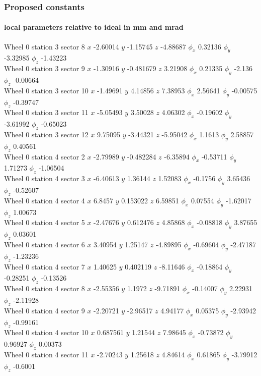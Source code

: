 \documentclass[compress]{beamer}
\begin{document}
\begin{frame}
\frametitle{Proposed constants}
\framesubtitle{local parameters relative to ideal in mm and mrad}

\tiny

Wheel 0 station 3 sector 8 $x$ -2.60014 $y$ -1.15745 $z$ -4.88687 $\phi_x$ 0.32136 $\phi_y$ -3.32985 $\phi_z$ -1.43223 \\
Wheel 0 station 3 sector 9 $x$ -1.30916 $y$ -0.481679 $z$ 3.21908 $\phi_x$ 0.21335 $\phi_y$ -2.136 $\phi_z$ -0.00664 \\
Wheel 0 station 3 sector 10 $x$ -1.49691 $y$ 4.14856 $z$ 7.38953 $\phi_x$ 2.56641 $\phi_y$ -0.00575 $\phi_z$ -0.39747 \\
Wheel 0 station 3 sector 11 $x$ -5.05493 $y$ 3.50028 $z$ 4.06302 $\phi_x$ -0.19602 $\phi_y$ -3.61992 $\phi_z$ -0.65023 \\
Wheel 0 station 3 sector 12 $x$ 9.75095 $y$ -3.44321 $z$ -5.95042 $\phi_x$ 1.1613 $\phi_y$ 2.58857 $\phi_z$ 0.40561 \\
Wheel 0 station 4 sector 2 $x$ -2.79989 $y$ -0.482284 $z$ -6.35894 $\phi_x$ -0.53711 $\phi_y$ 1.71273 $\phi_z$ -1.06504 \\
Wheel 0 station 4 sector 3 $x$ -6.40613 $y$ 1.36144 $z$ 1.52083 $\phi_x$ -0.1756 $\phi_y$ 3.65436 $\phi_z$ -0.52607 \\
Wheel 0 station 4 sector 4 $x$ 6.8457 $y$ 0.153022 $z$ 6.59851 $\phi_x$ 0.07554 $\phi_y$ -1.62017 $\phi_z$ 1.00673 \\
Wheel 0 station 4 sector 5 $x$ -2.47676 $y$ 0.612476 $z$ 4.85868 $\phi_x$ -0.08818 $\phi_y$ 3.87655 $\phi_z$ 0.03601 \\
Wheel 0 station 4 sector 6 $x$ 3.40954 $y$ 1.25147 $z$ -4.89895 $\phi_x$ -0.69604 $\phi_y$ -2.47187 $\phi_z$ -1.23236 \\
Wheel 0 station 4 sector 7 $x$ 1.40625 $y$ 0.402119 $z$ -8.11646 $\phi_x$ -0.18864 $\phi_y$ -0.28251 $\phi_z$ -0.13526 \\
Wheel 0 station 4 sector 8 $x$ -2.55356 $y$ 1.1972 $z$ -9.71891 $\phi_x$ -0.14007 $\phi_y$ 2.22931 $\phi_z$ -2.11928 \\
Wheel 0 station 4 sector 9 $x$ -2.20721 $y$ -2.96517 $z$ 4.94177 $\phi_x$ 0.05375 $\phi_y$ -2.93942 $\phi_z$ -0.99161 \\
Wheel 0 station 4 sector 10 $x$ 0.687561 $y$ 1.21544 $z$ 7.98645 $\phi_x$ -0.73872 $\phi_y$ 0.96927 $\phi_z$ 0.00373 \\
Wheel 0 station 4 sector 11 $x$ -2.70243 $y$ 1.25618 $z$ 4.84614 $\phi_x$ 0.61865 $\phi_y$ -3.79912 $\phi_z$ -0.6001 \\

\end{frame}
\end{document}
